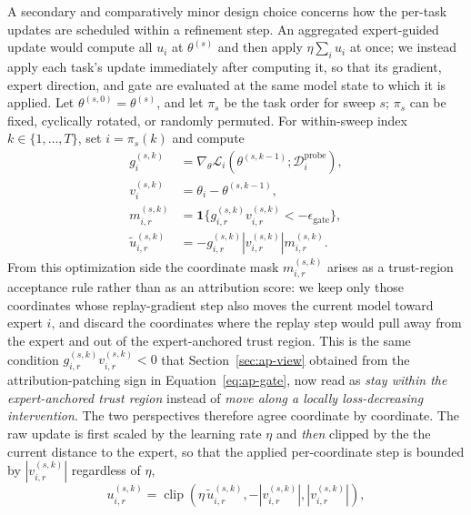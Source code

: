 \documentclass[11pt]{article}
\newcommand{\loss}{\mathcal{L}}
\newcommand{\data}{\mathcal{D}}
\newcommand{\ind}{\mathbf{1}}
\DeclareMathOperator{\clip}{clip}
\begin{document}
A secondary and comparatively minor design choice concerns how the per-task updates are scheduled within a refinement step. An aggregated expert-guided update would compute all $u_i$ at $\theta^{(s)}$ and then apply $\eta\sum_i u_i$ at once; we instead apply each task's update immediately after computing it, so that its gradient, expert direction, and gate are evaluated at the same model state to which it is applied. Let $\theta^{(s,0)}=\theta^{(s)}$, and let $\pi_s$ be the task order for sweep $s$; $\pi_s$ can be fixed, cyclically rotated, or randomly permuted. For within-sweep index $k\in\{1,\ldots,T\}$, set $i=\pi_s(k)$ and compute
\begin{align}
    g_i^{(s,k)}
    &=
    \nabla_\theta \loss_i(\theta^{(s,k-1)};\data_i^{\mathrm{probe}}),
    \label{eq:sequential-gradient}\\
    v_i^{(s,k)}
    &=
    \theta_i - \theta^{(s,k-1)},
    \label{eq:sequential-direction}\\
    m_{i,r}^{(s,k)}
    &=
    \ind\{g_{i,r}^{(s,k)}v_{i,r}^{(s,k)} < -\epsilon_{\mathrm{gate}}\},
    \label{eq:sequential-mask}\\
    \widetilde u_{i,r}^{(s,k)}
    &=
    -g_{i,r}^{(s,k)}|v_{i,r}^{(s,k)}|m_{i,r}^{(s,k)}.
    \label{eq:sequential-raw-update}
\end{align}
From this optimization side the coordinate mask $m_{i,r}^{(s,k)}$ arises as a trust-region acceptance rule rather than as an attribution score: we keep only those coordinates whose replay-gradient step also moves the current model toward expert $i$, and discard the coordinates where the replay step would pull away from the expert and out of the expert-anchored trust region. This is the same condition $g_{i,r}^{(s,k)}v_{i,r}^{(s,k)}<0$ that Section~\ref{sec:ap-view} obtained from the attribution-patching sign in Equation~\eqref{eq:ap-gate}, now read as \emph{stay within the expert-anchored trust region} instead of \emph{move along a locally loss-decreasing intervention}. The two perspectives therefore agree coordinate by coordinate.
The raw update is first scaled by the learning rate $\eta$ and \emph{then} clipped by the the current distance to the expert, so that the applied per-coordinate step is bounded by $|v_{i,r}^{(s,k)}|$ regardless of $\eta$,
\begin{equation}
    u_{i,r}^{(s,k)}
    =
    \clip\!\left(
        \eta\,\widetilde u_{i,r}^{(s,k)},
        - |v_{i,r}^{(s,k)}|,
         |v_{i,r}^{(s,k)}|
    \right),
    \label{eq:clipped-update}
\end{equation}
\end{document}
